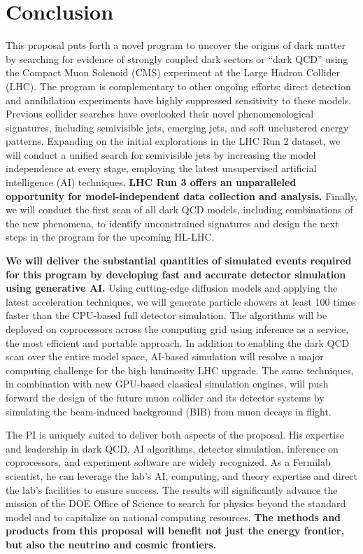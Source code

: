 \section{Conclusion}\label{sec:conclusion}

This proposal puts forth a novel program to uncover the origins of dark matter
by searching for evidence of strongly coupled dark sectors or ``dark QCD''
using the Compact Muon Solenoid (CMS) experiment at the Large Hadron Collider (LHC).
The program is complementary to other ongoing efforts:
direct detection and annihilation experiments have highly suppressed sensitivity to these models.
Previous collider searches have overlooked their novel phenomenological signatures,
including semivisible jets, emerging jets, and soft unclustered energy patterns.
Expanding on the initial explorations in the LHC Run 2 dataset,
we will conduct a unified search for semivisible jets by increasing the model independence at every stage,
employing the latest unsupervised artificial intelligence (AI) techniques.
\textbf{LHC Run 3 offers an unparalleled opportunity for model-independent data collection and analysis.}
Finally, we will conduct the first scan of all dark QCD models, including combinations of the new phenomena,
to identify unconstrained signatures and design the next steps in the program for the upcoming HL-LHC.

\textbf{We will deliver the substantial quantities of simulated events required for this program
by developing fast and accurate detector simulation using generative AI.}
Using cutting-edge diffusion models and applying the latest acceleration techniques,
we will generate particle showers at least 100 times faster than the CPU-based full detector simulation.
The algorithms will be deployed on coprocessors across the computing grid using inference as a service,
the most efficient and portable approach.
In addition to enabling the dark QCD scan over the entire model space,
AI-based simulation will resolve a major computing challenge for the high luminosity LHC upgrade.
The same techniques, in combination with new GPU-based classical simulation engines,
will push forward the design of the future muon collider and its detector systems
by simulating the beam-induced background (BIB) from muon decays in flight.

The PI is uniquely suited to deliver both aspects of the proposal.
His expertise and leadership in dark QCD, AI algorithms, detector simulation, inference on coprocessors, and experiment software are widely recognized.
As a Fermilab scientist, he can leverage the lab's AI, computing, and theory expertise and direct the lab's facilities to ensure success.
The results will significantly advance the mission of the DOE Office of Science to search for physics beyond the standard model and to capitalize on national computing resources.
\textbf{The methods and products from this proposal will benefit not just the energy frontier, but also the neutrino and cosmic frontiers.}

